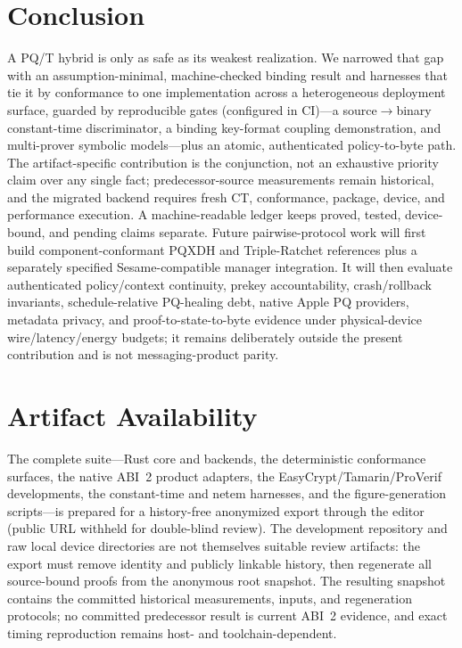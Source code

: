 \documentclass[journal]{IEEEtran}
\begin{document}
\section{Conclusion}\label{sec:concl}
A PQ/T hybrid is only as safe as its weakest realization. We narrowed that gap with an
assumption-minimal, machine-checked binding result and harnesses that tie it by conformance to one
implementation across a heterogeneous deployment surface, guarded by reproducible gates
(configured in CI)---a source$\to$binary
constant-time discriminator, a binding key-format coupling demonstration, and multi-prover symbolic
models---plus an atomic, authenticated policy-to-byte path. The artifact-specific contribution is
the conjunction, not an exhaustive priority claim over any single fact; predecessor-source
measurements remain historical, and the migrated backend requires fresh CT, conformance, package,
device, and performance execution. A machine-readable ledger keeps proved, tested, device-bound,
and pending claims separate.
Future pairwise-protocol work will first build component-conformant PQXDH and Triple-Ratchet
references plus a separately specified Sesame-compatible manager integration. It will then evaluate
authenticated policy/context continuity, prekey accountability, crash/rollback invariants,
schedule-relative PQ-healing debt, native Apple PQ providers, metadata privacy, and
proof-to-state-to-byte evidence under physical-device wire/latency/energy budgets; it remains
deliberately outside the present contribution and is not messaging-product parity.

\appendices
\section{Artifact Availability}
The complete suite---Rust core and backends, the deterministic conformance surfaces, the native
ABI~2 product adapters, the EasyCrypt/Tamarin/ProVerif
developments, the constant-time and netem harnesses, and the figure-generation scripts---is prepared
for a history-free anonymized export through the editor (public URL withheld for double-blind
review). The development repository and raw local device directories are not themselves suitable
review artifacts: the export must remove identity and publicly linkable history, then regenerate all
source-bound proofs from the anonymous root snapshot. The resulting snapshot contains the committed
historical measurements, inputs, and regeneration protocols; no committed predecessor result is
current ABI~2 evidence, and exact timing reproduction remains host- and
toolchain-dependent.
\end{document}
